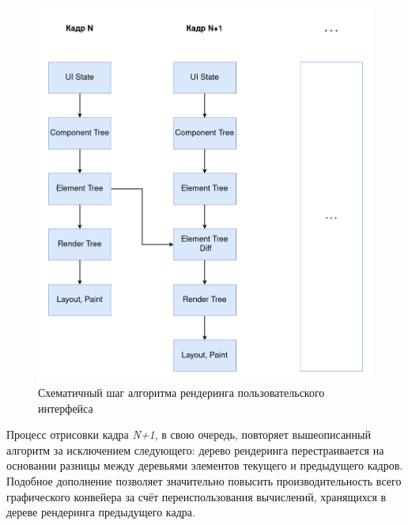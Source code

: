 \begin{figure}[h]
\centering
\includegraphics[width=\linewidth,height=0.9\linewidth,keepaspectratio]{resources/ui-render-pipeline.png}
\caption{Схематичный шаг алгоритма рендеринга пользовательского интерфейса}
\label{render-pipeline}
\end{figure}

Процесс отрисовки кадра \textit{N+1}, в свою очередь, повторяет
вышеописанный алгоритм за исключением следующего: дерево рендеринга
перестраивается на основании разницы между деревьями элементов текущего и
предыдущего кадров.
Подобное дополнение позволяет значительно повысить производительность
всего графического конвейера за счёт переиспользования вычислений,
хранящихся в дереве рендеринга предыдущего кадра.

